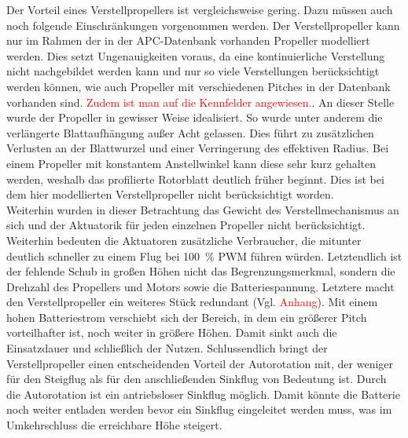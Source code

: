 	Der Vorteil eines Verstellpropellers ist vergleichsweise gering. Dazu müssen auch noch folgende Einschränkungen vorgenommen werden. Der Verstellpropeller kann nur im Rahmen der in der APC-Datenbank vorhanden Propeller modelliert werden. Dies setzt Ungenauigkeiten voraus, da eine kontinuierliche Verstellung nicht nachgebildet werden kann und nur so viele Verstellungen berücksichtigt werden können, wie auch Propeller mit verschiedenen Pitches in der Datenbank vorhanden sind. \textcolor{red}{Zudem ist man auf die Kennfelder angewiesen.}. An dieser Stelle wurde der Propeller in gewisser Weise idealisiert. So wurde unter anderem die verlängerte Blattaufhängung außer Acht gelassen. Dies führt zu zusätzlichen Verlusten an der Blattwurzel und einer Verringerung des effektiven Radius. Bei einem Propeller mit konstantem Anstellwinkel kann diese sehr kurz gehalten werden, weshalb das profilierte Rotorblatt deutlich früher beginnt. Dies ist bei dem hier modellierten Verstellpropeller nicht berücksichtigt worden.\\
Weiterhin wurden in dieser Betrachtung das Gewicht des Verstellmechanismus an sich und der Aktuatorik für jeden einzelnen Propeller nicht berücksichtigt. Weiterhin bedeuten die Aktuatoren zusätzliche Verbraucher, die mitunter deutlich schneller zu einem Flug bei \SI{100}{\%} PWM führen würden. Letztendlich ist der fehlende Schub in großen Höhen nicht das Begrenzungsmerkmal, sondern die Drehzahl des Propellers und Motors sowie die Batteriespannung. Letztere macht den Verstellpropeller ein weiteres Stück redundant (Vgl. \textcolor{red}{Anhang}). Mit einem hohen Batteriestrom verschiebt sich der Bereich, in dem ein größerer Pitch vorteilhafter ist, noch weiter in größere Höhen. Damit sinkt auch die Einsatzdauer und schließlich der Nutzen. 
Schlussendlich bringt der Verstellpropeller einen entscheidenden Vorteil der Autorotation mit, der weniger für den Steigflug als für den anschließenden Sinkflug von Bedeutung ist. Durch die Autorotation ist ein antriebsloser Sinkflug möglich. Damit könnte die Batterie noch weiter entladen werden bevor ein Sinkflug eingeleitet werden muss, was im Umkehrschluss die erreichbare Höhe steigert. 

